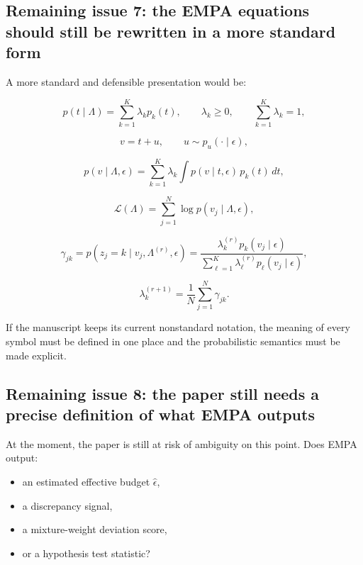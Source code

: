 \documentclass[11pt]{article}
\begin{document}
\subsection*{Remaining issue 7: the EMPA equations should still be rewritten in a more standard form}
A more standard and defensible presentation would be:

\begin{equation}
p(t \mid \Lambda)
=
\sum_{k=1}^{K} \lambda_k p_k(t),
\qquad
\lambda_k \ge 0,
\qquad
\sum_{k=1}^{K}\lambda_k = 1,
\label{eq:mixture-model-remaining}
\end{equation}

\begin{equation}
v = t + u,
\qquad
u \sim p_u(\cdot \mid \epsilon),
\label{eq:obs-model-remaining}
\end{equation}

\begin{equation}
p(v \mid \Lambda,\epsilon)
=
\sum_{k=1}^{K}
\lambda_k
\int
p(v \mid t,\epsilon)\,p_k(t)\,dt,
\label{eq:marginal-remaining}
\end{equation}

\begin{equation}
\mathcal{L}(\Lambda)
=
\sum_{j=1}^{N}
\log p(v_j \mid \Lambda,\epsilon),
\label{eq:loglik-remaining}
\end{equation}

\begin{equation}
\gamma_{jk}
=
p(z_j=k \mid v_j,\Lambda^{(r)},\epsilon)
=
\frac{
\lambda_k^{(r)} p_k(v_j \mid \epsilon)
}{
\sum_{\ell=1}^{K}
\lambda_\ell^{(r)} p_\ell(v_j \mid \epsilon)
},
\label{eq:responsibility-remaining}
\end{equation}

\begin{equation}
\lambda_k^{(r+1)}
=
\frac{1}{N}
\sum_{j=1}^{N}\gamma_{jk}.
\label{eq:mstep-remaining}
\end{equation}

If the manuscript keeps its current nonstandard notation, the meaning of every symbol must be defined in one place and the probabilistic semantics must be made explicit.

\subsection*{Remaining issue 8: the paper still needs a precise definition of what EMPA outputs}
At the moment, the paper is still at risk of ambiguity on this point. Does EMPA output:
\begin{itemize}
    \item an estimated effective budget \(\hat{\epsilon}\),
    \item a discrepancy signal,
    \item a mixture-weight deviation score,
    \item or a hypothesis test statistic?
\end{itemize}
\end{document}
